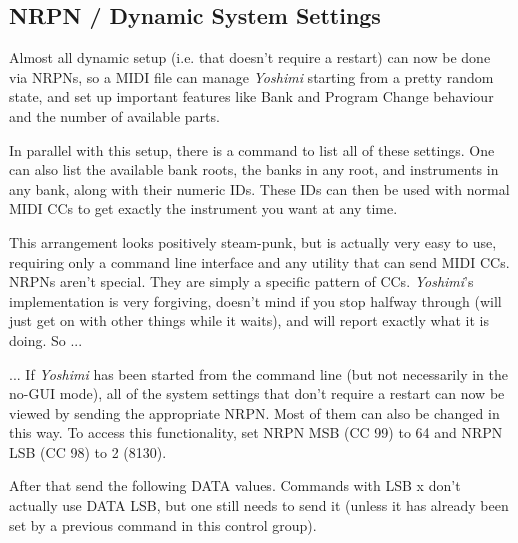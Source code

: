 \subsection{NRPN / Dynamic System Settings}
\label{subsection:nrpns_dynamic_system_settings}

   Almost all dynamic setup (i.e. that doesn't require a restart) can now
   be done via NRPNs, so a MIDI file can manage \textsl{Yoshimi} starting
   from a pretty random state, and set up important features like Bank and
   Program Change behaviour and the number of available parts.

   In parallel with this setup, there is a command to list all of these
   settings. One can also list the available bank roots, the banks in any
   root, and instruments in any bank, along with their numeric IDs. These
   IDs can then be used with normal MIDI CCs to get exactly the instrument
   you want at any time.

   This arrangement looks positively steam-punk, but is actually very easy
   to use, requiring only a command line interface and any utility that can
   send MIDI CCs. NRPNs aren't special. They are simply a specific pattern
   of CCs. \textsl{Yoshimi}'s implementation is very forgiving, doesn't
   mind if you stop halfway through (will just get on with other things
   while it waits), and will report exactly what it is doing.  So ...

   ... If \textsl{Yoshimi} has been started from the command line (but not
   necessarily in the no-GUI mode), all of the system settings that don't
   require a restart can now be viewed by sending the appropriate NRPN.
   Most of them can also be changed in this way.
   To access this functionality, set NRPN MSB (CC 99) to 64 and NRPN LSB
   (CC 98) to 2 (8130).

   After that send the following DATA values. Commands with LSB x don't
   actually use DATA LSB, but one still needs to send it (unless it has
   already been set by a previous command in this control group).


